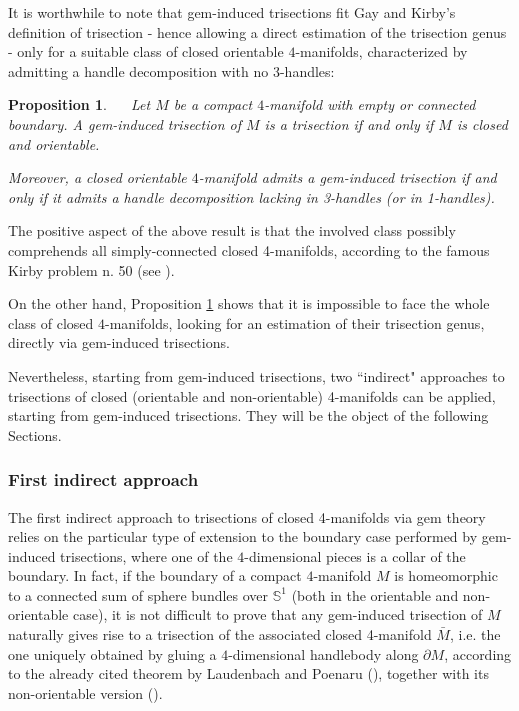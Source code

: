 \documentclass[12pt,a4paper]{article}
\newtheorem{proposition}[lemma]{Proposition}
\begin{document}

It is worthwhile to note that gem-induced trisections fit Gay and Kirby's definition of trisection - hence allowing a direct estimation of the trisection genus - only for a suitable class of closed orientable $4$-manifolds, characterized by admitting a handle decomposition with no 3-handles:  

\begin{proposition}\label{trisection_vs_gem-induced}  \  {\rm \cite{Casali-Cristofori trisection bis} } \ 
Let $M$ be a compact $4$-manifold with empty or connected boundary. 
A gem-induced trisection of $M$ is a trisection if and only if  $M$ is closed and orientable. 

\noindent Moreover, a closed orientable $4$-manifold admits a gem-induced trisection if and only if it admits a handle decomposition lacking in 3-handles (or in 1-handles).
\end{proposition}


The positive aspect of the above result is that the involved class possibly comprehends all simply-connected closed 4-manifolds, according to the famous Kirby problem n. 50 (see \cite[Section 7.3]{[M]}).

On the other hand, Proposition \ref{trisection_vs_gem-induced} shows that it is impossible to face the whole class of closed $4$-manifolds, looking for an estimation of their trisection genus, directly via gem-induced trisections.  

Nevertheless, starting from gem-induced trisections,  
two ``indirect" approaches to trisections of closed (orientable and non-orientable) 4-manifolds can be applied, starting from gem-induced trisections. They will be the object of the following Sections. 


\bigskip

\subsubsection{First indirect approach} \label{ss: First indirect approach} \par \noindent

The first indirect approach to trisections of closed 4-manifolds via gem theory relies on the particular type of extension to the boundary case performed by gem-induced trisections, where one of the $4$-dimensional pieces is a collar of the boundary.   In fact, if the boundary of a compact $4$-manifold  $M$ is homeomorphic to a connected sum of sphere bundles over $\mathbb S^1$ (both in the orientable and non-orientable case), it is not difficult to prove that any  gem-induced trisection of $M$ naturally gives rise to a trisection of the associated closed 4-manifold $\bar M$, i.e. the one uniquely obtained by gluing a $4$-dimensional handlebody along $\partial M$, according to the already cited theorem by Laudenbach and Poenaru (\cite{Laudenbach-Poenaru}), together with its non-orientable version (\cite{Miller-Naylor}).  
\end{document}
